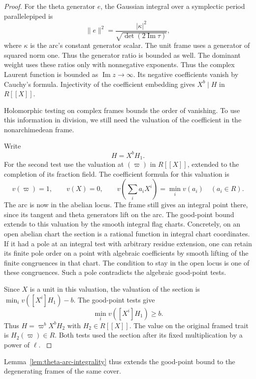\begin{proof}
For the theta generator \(e\), the Gaussian integral over a symplectic period parallelepiped is
\[
 \|e\|^2=\frac{|\kappa|^2}{\sqrt{\det(2\operatorname{Im}\tau)}} ,
\]
where \(\kappa\) is the arc's constant generator scalar. The unit frame uses a generator of squared norm
one. Thus the generator ratio is bounded as well.
The dominant weight uses these ratios only with
nonnegative exponents. Thus the complex Laurent
function is bounded as \(\operatorname{Im}z\to\infty\).
Its negative coefficients vanish by Cauchy's formula.
Injectivity of the coefficient embedding gives
\(X^b\mid H\) in \(R[[X]]\).

Holomorphic testing on complex frames bounds the order of vanishing. To use this information in division, we still need the valuation of the coefficient in the nonarchimedean frame.

Write
\[
 H=X^b H_1.
\]
For the second test use the
valuation at \((\varpi)\) in \(R[[X]]\), extended to the
completion of its fraction field. The coefficient formula for this valuation is
\[
 v(\varpi)=1,\qquad v(X)=0,\qquad
 v\!\left(\sum_i a_iX^i\right)=\min_i v(a_i)\quad(a_i\in R).
\]
The arc is now in the abelian locus. The frame still
gives an integral point there, since its tangent and
theta generators lift on the arc. The good-point
bound extends to this valuation by the smooth
integral flag charts. Concretely, on an open
abelian chart the section is a rational function
in integral chart coordinates. If it had a pole
at an integral test with arbitrary residue extension,
one can retain its finite pole order on a point with
algebraic coefficients by smooth lifting of the
finite congruences in that chart. The condition to
stay in the open locus is one of these congruences.
Such a pole contradicts the algebraic good-point tests.

Since \(X\) is a unit in this valuation, the valuation of the
section is \(\min_i v([X^i]H_1)-b\). The good-point tests give
\[
 \min_i v([X^i]H_1)\ge b.
\]
Thus \(H=\varpi^bX^b H_2\)
with \(H_2\in R[[X]]\). The value on the original framed trait
is \(H_2(\varpi)\in R\). Both tests used the section after its
fixed multiplication by a power of \(\ell\).
\label{cor:theta-cover-integrality-2}
\end{proof}

Lemma~\ref{lem:theta-arc-integrality} thus extends the good-point
bound to the degenerating frames of the same cover.

